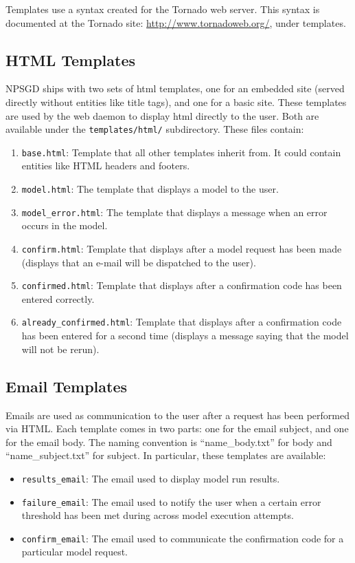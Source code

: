 \documentclass{article}
\newcommand{\mpath}[1]{\texttt{#1}}
\begin{document}
Templates use a syntax created for the Tornado web server. This syntax is
documented at the Tornado site: \url{http://www.tornadoweb.org/}, under
templates.

\subsection{HTML Templates}
NPSGD ships with two sets of html templates, one for an embedded site (served
directly without entities like title tags), and one for a basic site. These
templates are used by the web daemon to display html directly to the user. Both are
available under the \mpath{templates/html/} subdirectory. These files contain:
\begin{enumerate}
    \item \texttt{base.html}: Template that all other templates inherit from.
    It could contain entities like HTML headers and footers.

    \item \texttt{model.html}: The template that displays a model to the user.

    \item \texttt{model\_error.html}: The template that displays a message when
    an error occurs in the model.

    \item \texttt{confirm.html}: Template that displays after a model request has
    been made (displays that an e-mail will be dispatched to the user).

    \item \texttt{confirmed.html}: Template that displays after a confirmation code
    has been entered correctly.

    \item \texttt{already\_confirmed.html}: Template that displays after a
    confirmation code has been entered for a second time (displays a
    message saying that the model will not be rerun).
\end{enumerate}

\subsection{Email Templates}
Emails are used as communication to the user after a request has been performed
via HTML. Each template comes in two parts: one for the email subject, and one
for the email body. The naming convention is ``name\_body.txt'' for body and
``name\_subject.txt'' for subject. In particular, these templates are available:
\begin{itemize}
    \item \texttt{results\_email}: The email used to display model run results.
    \item \texttt{failure\_email}: The email used to notify the user when a
    certain error threshold has been met during across model execution attempts.
    \item \texttt{confirm\_email}: The email used to communicate the
    confirmation code for a particular model request.
\end{itemize}
\end{document}
